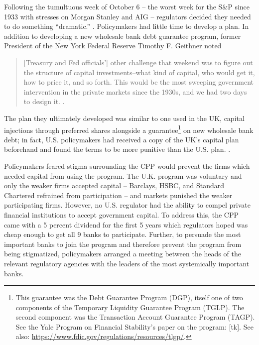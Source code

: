 \documentclass[12pt]{article}
\begin{document}
Following the tumultuous week of October 6 -- the worst week for the S\&P since 1933 with stresses on Morgan Stanley and AIG -- regulators decided they needed to do something ``dramatic.'' \citep{paulsonbook}. Policymakers had little time to develop a plan. In addition to developing a new wholesale bank debt guarantee program, former President of the New York Federal Reserve Timothy F. Geithner noted
\begin{quote}
[Treasury and Fed officials'] other challenge that weekend was to figure out the structure of capital investments--what kind of capital, who would get it, how to price it, and so forth. This would be the most sweeping government intervention in the private markets since the 1930s, and we had two days to design it. \citep{Geithner}.
\end{quote}
The plan they ultimately developed was similar to one used in the UK, capital injections through preferred shares alongside a guarantee\footnote{This guarantee was the Debt Guarantee Program (DGP), itself one of two components of the Temporary Liquidity Guarantee Program (TGLP). The second component was the Transaction Account Guarantee Program (TAGP). See the Yale Program on Financial Stability's paper on the program: [tk]. See also: \url{https://www.fdic.gov/regulations/resources/tlgp/}.} on new wholesale bank debt; in fact, U.S. policymakers had received a copy of the UK's capital plan beforehand and found the terms to be more punitive than the U.S. plan. \citep{paulsonbook}.

Policymakers feared stigma surrounding the CPP would prevent the firms which needed capital from using the program. The U.K. program was voluntary and only the weaker firms accepted capital -- Barclays, HSBC, and Standard Chartered refrained from participation -- and markets punished the weaker participating firms. However, no U.S. regulator had the ability to compel private financial institutions to accept government capital. To address this, the CPP came with a 5 percent dividend for the first 5 years which regulators hoped was cheap enough to get all 9 banks to participate. Further, to persuade the most important banks to join the program and therefore prevent the program from being stigmatized, policymakers arranged a meeting between the heads of the relevant regulatory agencies with the leaders of the most systemically important banks.
\end{document}
